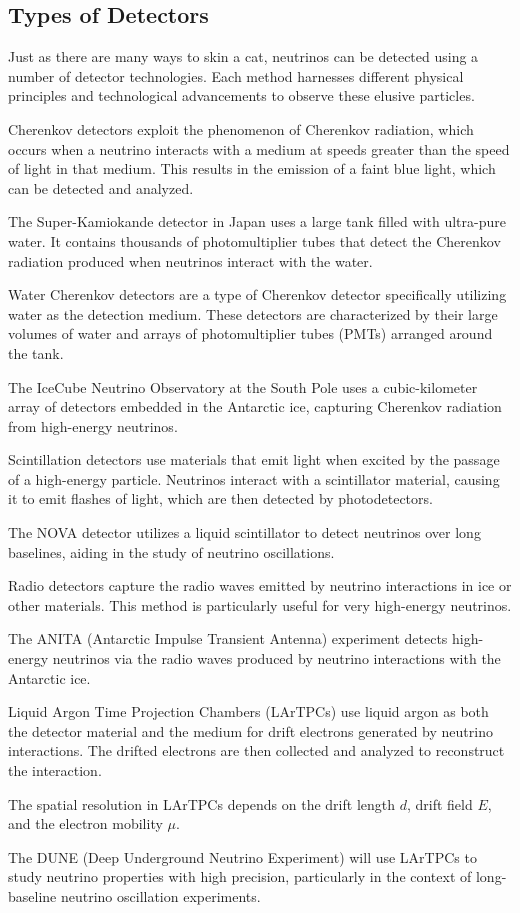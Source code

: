 \subsection{Types of Detectors}

Just as there are many ways to skin a cat, neutrinos can be detected using a number of detector technologies.
Each method harnesses different physical principles and technological advancements to observe these elusive particles.

Cherenkov detectors exploit the phenomenon of Cherenkov radiation, which occurs when a neutrino interacts with a medium at speeds greater than the speed of light in that medium.
This results in the emission of a faint blue light, which can be detected and analyzed.

The Super-Kamiokande detector in Japan uses a large tank filled with ultra-pure water.
It contains thousands of photomultiplier tubes that detect the Cherenkov radiation produced when neutrinos interact with the water.

Water Cherenkov detectors are a type of Cherenkov detector specifically utilizing water as the detection medium.
These detectors are characterized by their large volumes of water and arrays of photomultiplier tubes (PMTs) arranged around the tank.

The IceCube Neutrino Observatory at the South Pole uses a cubic-kilometer array of detectors embedded in the Antarctic ice, capturing Cherenkov radiation from high-energy neutrinos.

Scintillation detectors use materials that emit light when excited by the passage of a high-energy particle.
Neutrinos interact with a scintillator material, causing it to emit flashes of light, which are then detected by photodetectors.

The NOVA detector utilizes a liquid scintillator to detect neutrinos over long baselines, aiding in the study of neutrino oscillations.

Radio detectors capture the radio waves emitted by neutrino interactions in ice or other materials.
This method is particularly useful for very high-energy neutrinos.

The ANITA (Antarctic Impulse Transient Antenna) experiment detects high-energy neutrinos via the radio waves produced by neutrino interactions with the Antarctic ice.

Liquid Argon Time Projection Chambers (LArTPCs) use liquid argon as both the detector material and the medium for drift electrons generated by neutrino interactions.
The drifted electrons are then collected and analyzed to reconstruct the interaction.

The spatial resolution in LArTPCs depends on the drift length \( d \), drift field \( E \), and the electron mobility \( \mu \).

The DUNE (Deep Underground Neutrino Experiment) will use LArTPCs to study neutrino properties with high precision, particularly in the context of long-baseline neutrino oscillation experiments.

